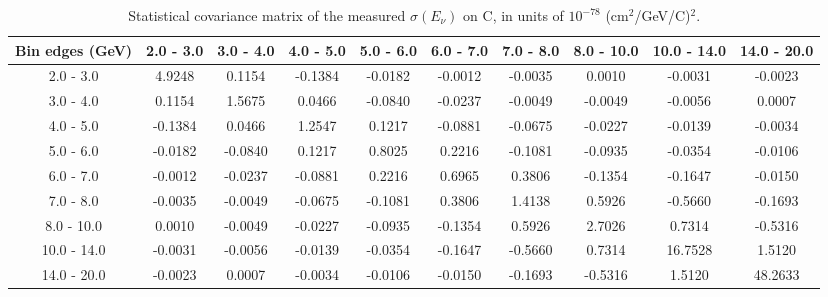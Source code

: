 \documentclass[aps,prl,twocolumn,superscriptaddress,nofootinbib]{revtex4-1}
\begin{document}
\begin{table}[h!]
  \centering
  \caption{Statistical covariance matrix of the measured $\sigma(E_{\nu})$ on C, in units of $10^{-78}$ (cm$^{2}$/GeV/C)$^{2}$.}
    \begin{tabular}{c||ccccccccc}
      Bin edges (GeV) & 2.0 - 3.0 & 3.0 - 4.0 & 4.0 - 5.0 & 5.0 - 6.0 & 6.0 - 7.0 & 7.0 - 8.0 & 8.0 - 10.0 & 10.0 - 14.0 & 14.0 - 20.0 \\
\hline \hline
        2.0 - 3.0 &  4.9248 &  0.1154 & -0.1384 & -0.0182 & -0.0012 & -0.0035 &  0.0010 & -0.0031 & -0.0023 \\
        3.0 - 4.0 &  0.1154 &  1.5675 &  0.0466 & -0.0840 & -0.0237 & -0.0049 & -0.0049 & -0.0056 &  0.0007 \\
        4.0 - 5.0 & -0.1384 &  0.0466 &  1.2547 &  0.1217 & -0.0881 & -0.0675 & -0.0227 & -0.0139 & -0.0034 \\
        5.0 - 6.0 & -0.0182 & -0.0840 &  0.1217 &  0.8025 &  0.2216 & -0.1081 & -0.0935 & -0.0354 & -0.0106 \\
        6.0 - 7.0 & -0.0012 & -0.0237 & -0.0881 &  0.2216 &  0.6965 &  0.3806 & -0.1354 & -0.1647 & -0.0150 \\
        7.0 - 8.0 & -0.0035 & -0.0049 & -0.0675 & -0.1081 &  0.3806 &  1.4138 &  0.5926 & -0.5660 & -0.1693 \\
       8.0 - 10.0 &  0.0010 & -0.0049 & -0.0227 & -0.0935 & -0.1354 &  0.5926 &  2.7026 &  0.7314 & -0.5316 \\
      10.0 - 14.0 & -0.0031 & -0.0056 & -0.0139 & -0.0354 & -0.1647 & -0.5660 &  0.7314 & 16.7528 &  1.5120 \\
      14.0 - 20.0 & -0.0023 &  0.0007 & -0.0034 & -0.0106 & -0.0150 & -0.1693 & -0.5316 &  1.5120 & 48.2633 \\
    \end{tabular}
  \label{tablecov:C_Statistical_Enu}
\end{table}
\end{document}

